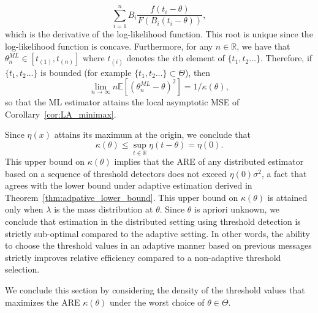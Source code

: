\documentclass[letterpaper, 11pt]{IEEEtran}      %
\newcommand{\ex}[1]{\ensuremath{\mathbb{E}\left[ #1\right]}}
\begin{document}
\begin{equation}
\label{eq:ML}
\sum_{i=1}^n B_i \frac{f \left( t_i-\theta\right) }{F \left(B_i  (t_i-\theta)\right) },  
\end{equation}
which is the derivative of the log-likelihood function. This root is unique since the log-likelihood function is concave. Furthermore, for any $n \in \mathbb R$, we have that ${\theta}^{ML}_n  \in [t_{(1)}, t_{(n)}]$ where $t_{(i)}$ denotes the $i$th element of $\{t_1,t_2\ldots\}$. Therefore, if $\{t_1,t_2\ldots\}$ is bounded (for example $\{t_1,t_2\ldots\} \subset \Theta$), then 
\[
\lim_{n\to \infty} n \ex{\left({\theta}^{ML}_n - \theta \right)^2}  = 1/\kappa(\theta), 
\] 
so that the ML estimator attains the local asymptotic MSE of Corollary~\ref{cor:LA_minimax}. \par
%
Since $\eta(x)$ attains its maximum at the origin, we conclude that
\[
\kappa(\theta) \leq \sup_{t\in \mathbb R} \eta \left( t-\theta\right) = \eta(0).
\]
This upper bound on $\kappa(\theta)$ implies that the ARE of any distributed estimator based on a sequence of threshold detectors does not exceed $\eta(0)\sigma^2$, a fact that agrees with the lower bound under adaptive estimation derived in Theorem~\ref{thm:adpative_lower_bound}. 
%
This upper bound on $\kappa(\theta)$ is attained only when $\lambda$ is the mass distribution at $\theta$. Since $\theta$ is apriori unknown, we conclude that estimation in the distributed setting using threshold detection is strictly sub-optimal compared to the adaptive setting. In other words, the ability to choose the threshold values in an adaptive manner based on previous messages strictly improves relative efficiency compared to a non-adaptive threshold selection.  \par


%
We conclude this section by considering the density of the threshold values that maximizes the ARE $\kappa(\theta)$ under the worst choice of $\theta \in \Theta$.
\end{document}
